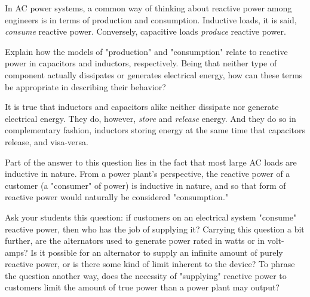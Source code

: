 

In AC power systems, a common way of thinking about reactive power among engineers is in terms of production and consumption.  Inductive loads, it is said, {\it consume} reactive power.  Conversely, capacitive loads {\it produce} reactive power.

Explain how the models of "production" and "consumption" relate to reactive power in capacitors and inductors, respectively.  Being that neither type of component actually dissipates or generates electrical energy, how can these terms be appropriate in describing their behavior?







It is true that inductors and capacitors alike neither dissipate nor generate electrical energy.  They do, however, {\it store} and {\it release} energy.  And they do so in complementary fashion, inductors storing energy at the same time that capacitors release, and visa-versa.

Part of the answer to this question lies in the fact that most large AC loads are inductive in nature.  From a power plant's perspective, the reactive power of a customer (a "consumer" of power) is inductive in nature, and so that form of reactive power would naturally be considered "consumption."







Ask your students this question: if customers on an electrical system "consume" reactive power, then who has the job of supplying it?  Carrying this question a bit further, are the alternators used to generate power rated in watts or in volt-amps?  Is it possible for an alternator to supply an infinite amount of purely reactive power, or is there some kind of limit inherent to the device?  To phrase the question another way, does the necessity of "supplying" reactive power to customers limit the amount of true power than a power plant may output?




